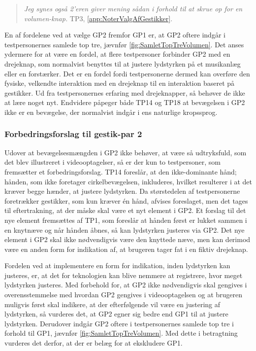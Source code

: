 % 
%
\begin{quotation}
	\noindent
	\textit{Jeg synes også 2'eren giver mening sådan i forhold til at skrue op for en volumen-knap.} TP3, \autoref{app:NoterValgAfGestikker}.
\noindent
\end{quotation}
%
En af fordelene ved at vælge GP2 fremfor GP1 er, at GP2 oftere indgår i testpersonernes samlede top tre, jævnfør \autoref{fig:SamletTopTreVolumen}. Det anses ydermere for at være en fordel, at flere testpersoner forbinder GP2 med en drejeknap, som normalvist benyttes til at justere lydstyrken på et musikanlæg eller en forstærker. Det er en fordel fordi testpersonerne dermed kan overføre den fysiske, velkendte interaktion med en drejeknap til en interaktion baseret på gestikker. Ud fra testpersonernes erfaring med drejeknapper, så behøver de ikke at lære noget nyt. Endvidere påpeger både TP14 og TP18 at bevægelsen i GP2 ikke er en bevægelse, der normalvist indgår i ens naturlige kropssprog. 
%
\subsubsection{Forbedringsforslag til gestik-par 2}
\label{TestresultaterValgAfGestikkerForbedringGP2Volumen}
%
Udover at bevægelsesmængden i GP2 ikke behøver, at være så udtryksfuld, som det blev illustreret i videooptagelser, så er der kun to testpersoner, som fremsætter et forbedringsforslag. TP14 foreslår, at den ikke-dominante hånd; hånden, som ikke foretager cirkelbevægelsen, inkluderes, hvilket resulterer i at det kræver begge hænder, at justere lydstyrken. Da størstedelen af testpersonerne foretrækker gestikker, som kun kræver én hånd, afvises foreslaget, men det tages til eftertrakning, at der måske skal være et nyt element i GP2. Et forslag til det nye element fremsættes af TP1, som foreslår at hånden først er lukket sammen i en knytnæve og når hånden åbnes, så kan lydstyrken justeres via GP2. Det nye element i GP2 skal ikke nødvendigvis være den knyttede næve, men kan derimod være en anden form for indikation af, at brugeren tager fat i en fiktiv drejeknap. 

Fordelen ved at implementere en form for indikation, inden lydstyrken kan justeres, er, at det for teknologien kan blive nemmere at registrere, hvor meget lydstyrken justeres.\blankline
%    
Med forbehold for, at GP2 ikke nødvendigvis skal gengives i overensstemmelse med hvordan GP2 gengives i videooptagelsen og at brugeren muligvis først skal indikere, at der efterfølgende vil være en justering af lydstyrken, så vurderes det, at GP2 egner sig bedre end GP1 til at justere lydstyrken. Derudover indgår GP2 oftere i testpersonernes samlede top tre i forhold til GP1, jævnfør \autoref{fig:SamletTopTreVolumen}. Med dette i betragtning vurderes det derfor, at der er belæg for at ekskludere GP1. 
%
